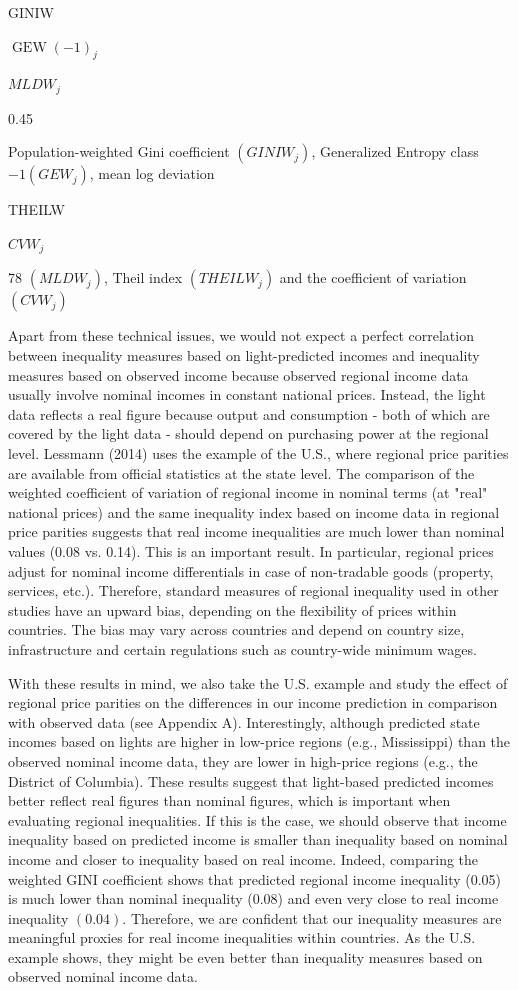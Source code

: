 \documentclass[10pt]{article}
\begin{document}
GINIW

$\operatorname{GEW}(-1)_{j}$

$M L D W_{j}$

0.45

Population-weighted Gini coefficient $\left(G I N I W_{j}\right)$, Generalized Entropy class $-1\left(G E W_{j}\right)$, mean log deviation

THEILW

$C V W_{j}$

78 $\left(M L D W_{j}\right)$, Theil index $\left(T H E I L W_{j}\right)$ and the coefficient of variation $\left(C V W_{j}\right)$

Apart from these technical issues, we would not expect a perfect correlation between inequality measures based on light-predicted incomes and inequality measures based on observed income because observed regional income data usually involve nominal incomes in constant national prices. Instead, the light data reflects a real figure because output and consumption - both of which are covered by the light data - should depend on purchasing power at the regional level. Lessmann (2014) uses the example of the U.S., where regional price parities are available from official statistics at the state level. The comparison of the weighted coefficient of variation of regional income in nominal terms (at "real" national prices) and the same inequality index based on income data in regional price parities suggests that real income inequalities are much lower than nominal values (0.08 vs. 0.14). This is an important result. In particular, regional prices adjust for nominal income differentials in case of non-tradable goods (property, services, etc.). Therefore, standard measures of regional inequality used in other studies have an upward bias, depending on the flexibility of prices within countries. The bias may vary across countries and depend on country size, infrastructure and certain regulations such as country-wide minimum wages.

With these results in mind, we also take the U.S. example and study the effect of regional price parities on the differences in our income prediction in comparison with observed data (see Appendix A). Interestingly, although predicted state incomes based on lights are higher in low-price regions (e.g., Mississippi) than the observed nominal income data, they are lower in high-price regions (e.g., the District of Columbia). These results suggest that light-based predicted incomes better reflect real figures than nominal figures, which is important when evaluating regional inequalities. If this is the case, we should observe that income inequality based on predicted income is smaller than inequality based on nominal income and closer to inequality based on real income. Indeed, comparing the weighted GINI coefficient shows that predicted regional income inequality (0.05) is much lower than nominal inequality (0.08) and even very close to real income inequality $(0.04)$. Therefore, we are confident that our inequality measures are meaningful proxies for real income inequalities within countries. As the U.S. example shows, they might be even better than inequality measures based on observed nominal income data.
\end{document}
